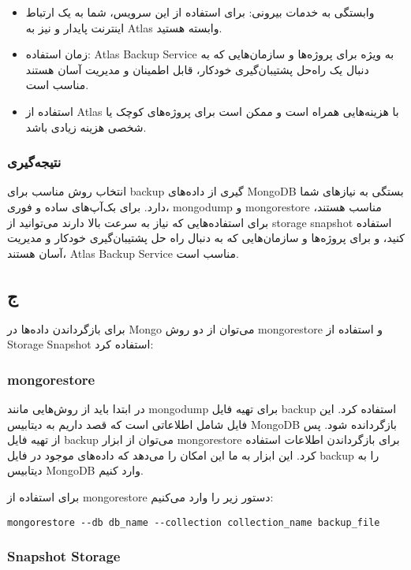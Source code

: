 \begin{itemize}
	\item وابستگی به خدمات بیرونی: برای استفاده از این سرویس، شما به یک ارتباط اینترنت پایدار و نیز به Atlas وابسته هستید.
	\item زمان استفاده:
	 Atlas Backup Service به ویژه برای پروژه‌ها و سازمان‌هایی که به دنبال یک راه‌حل پشتیبان‌گیری خودکار، قابل اطمینان و مدیریت آسان هستند مناسب است.
	\item 
	استفاده از Atlas با هزینه‌هایی همراه است و ممکن است برای پروژه‌های کوچک یا شخصی هزینه زیادی باشد.
\end{itemize}

\subsubsection*{نتیجه‌گیری}
انتخاب روش مناسب برای backup گیری از داده‌های MongoDB بستگی به نیازهای شما دارد. برای بک‌آپ‌های ساده و فوری، mongodump و mongorestore مناسب هستند، برای استفاده‌هایی که نیاز به سرعت بالا دارند می‌توانید از storage snapshot استفاده کنید، و برای پروژه‌ها و سازمان‌هایی که به دنبال راه‌ حل پشتیبان‌گیری خودکار و مدیریت آسان هستند،  Atlas Backup Service مناسب است.




\pagebreak
\subsection*{ج}
برای بازگرداندن داده‌ها در Mongo می‌توان از دو روش mongorestore و استفاده از Storage Snapshot استفاده کرد:

\subsubsection*{mongorestore}
در ابتدا باید از روش‌هایی مانند mongodump برای تهیه فایل backup استفاده کرد. این فایل شامل اطلاعاتی است که قصد داریم به دیتابیس MongoDB بازگردانده شود.
پس از تهیه فایل backup می‌توان از ابزار mongorestore برای بازگرداندن اطلاعات استفاده کرد. این ابزار به ما این امکان را می‌دهد که داده‌های موجود در فایل backup را به دیتابیس MongoDB وارد کنیم.

برای استفاده از mongorestore دستور زیر را وارد می‌کنیم:

\setLTR
\begin{lstlisting}
mongorestore --db db_name --collection collection_name backup_file
\end{lstlisting}
\setRTL

\subsubsection*{Snapshot Storage}

